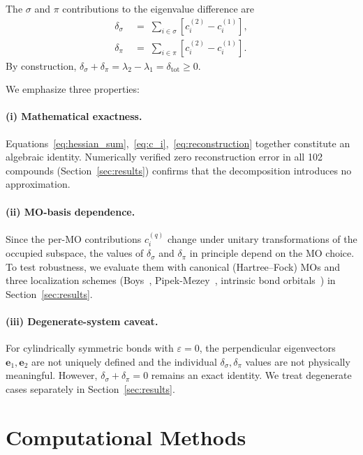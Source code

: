\documentclass[11pt,a4paper]{article}
\newcommand{\delsg}{\delta_{\sigma}}
\newcommand{\delpi}{\delta_{\pi}}
\newcommand{\eps}{\varepsilon}
\begin{document}
The $\sigma$ and $\pi$ contributions to the eigenvalue difference are
\begin{align}
\delsg &\;=\; \sum_{i \in \sigma} \!\left[c_i^{(2)} - c_i^{(1)}\right],
\label{eq:delta_sigma} \\
\delpi &\;=\; \sum_{i \in \pi} \!\left[c_i^{(2)} - c_i^{(1)}\right].
\label{eq:delta_pi}
\end{align}
By construction,
$\delsg + \delpi = \lambda_2 - \lambda_1 = \delta_{\text{tot}} \ge 0$.

We emphasize three properties:

\paragraph{(i) Mathematical exactness.} 
Equations~\ref{eq:hessian_sum},~\ref{eq:c_i},~\ref{eq:reconstruction}
together constitute an algebraic identity. Numerically verified
zero reconstruction error in all 102 compounds (Section~\ref{sec:results})
confirms that the decomposition introduces no approximation.

\paragraph{(ii) MO-basis dependence.}
Since the per-MO contributions $c_i^{(q)}$ change under unitary
transformations of the occupied subspace, the values of $\delsg$
and $\delpi$ in principle depend on the MO choice. To test
robustness, we evaluate them with canonical (Hartree--Fock)
MOs and three localization schemes
(Boys~\citep{Boys1960},
Pipek-Mezey~\citep{Pipek1989},
intrinsic bond orbitals~\citep{Knizia2013}) in
Section~\ref{sec:results}.

\paragraph{(iii) Degenerate-system caveat.}
For cylindrically symmetric bonds with $\eps = 0$, the perpendicular
eigenvectors $\mathbf{e}_1, \mathbf{e}_2$ are not uniquely defined and
the individual $\delsg, \delpi$ values are not physically meaningful.
However, $\delsg + \delpi = 0$ remains an exact identity. We treat
degenerate cases separately in Section~\ref{sec:results}.

\section{Computational Methods}
\label{sec:methods}
\end{document}
